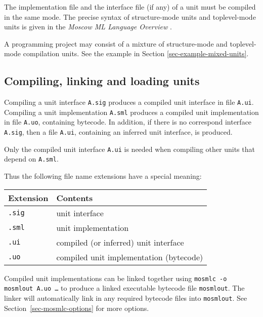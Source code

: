 \documentclass[fleqn,a4paper]{article}
\begin{document}
\noindent 
The implementation file and the interface file (if any) of a unit must
be compiled in the same mode.  The precise syntax of structure-mode
units and toplevel-mode units is given in the \emph{Moscow ML Language
  Overview} \cite{MoscowML:2000:MoscowMLLanguage}.

A programming project may consist of a mixture of structure-mode and
toplevel-mode compilation units. See the example in Section  \ref{sec-example-mixed-units}.
 

\subsection{Compiling, linking and loading units}

Compiling a unit interface \texttt{A.sig} produces a compiled unit
interface in file \texttt{A.ui}\@.  Compiling a unit implementation
\texttt{A.sml} produces a compiled unit implementation in file
\texttt{A.uo}, containing bytecode.  In addition, if there is no
correspond interface \texttt{A.sig}, then a file \texttt{A.ui},
containing an inferred unit interface, is produced.

Only the compiled unit interface \texttt{A.ui} is needed when
compiling other units that depend on \texttt{A.sml}.

Thus the following file name extensions have a special meaning: 

\begin{center}
\begin{tabular}{|l|l|}\hline
Extension & Contents\\\hline
\texttt{.sig} & unit interface\\
\texttt{.sml} & unit implementation\\
\texttt{.ui}  & compiled (or inferred) unit interface\\
\texttt{.uo}  & compiled unit implementation (bytecode)\\\hline
\end{tabular}
\end{center}

\noindent 
Compiled unit implementations can be linked together using {\tt mosmlc
  -o mosmlout A.uo \ldots} to produce a linked executable bytecode
file {\tt mosmlout}.  The linker will automatically link in any
required bytecode files into {\tt mosmlout}.  See
Section~\ref{sec-mosmlc-options} for more options.
\end{document}
